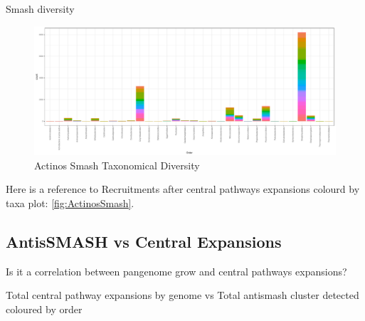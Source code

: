 \documentclass[12pt,twoside]{reedthesis}
\begin{document}
  Smash diversity
  
  \begin{figure}[h!tbp]
  \centering
  \includegraphics[angle = 0,scale = 0.5]{chapter4/ActinosSmash.pdf}
  \caption[Actinos Smash Taxonomical Diversity]{\normalsize{Actinos Smash Taxonomical Diversity}}
  \label{fig:ActinosSmash}
  \end{figure}
  
  Here is a reference to Recruitments after central pathways expansions
  colourd by taxa plot: \autoref{fig:ActinosSmash}. \clearpage
  
  \subsection{AntisSMASH vs Central
  Expansions}\label{antissmash-vs-central-expansions-1}
  
  Is it a correlation between pangenome grow and central pathways
  expansions?
  
  Total central pathway expansions by genome vs Total antismash cluster
  detected coloured by order
  
\end{document}
